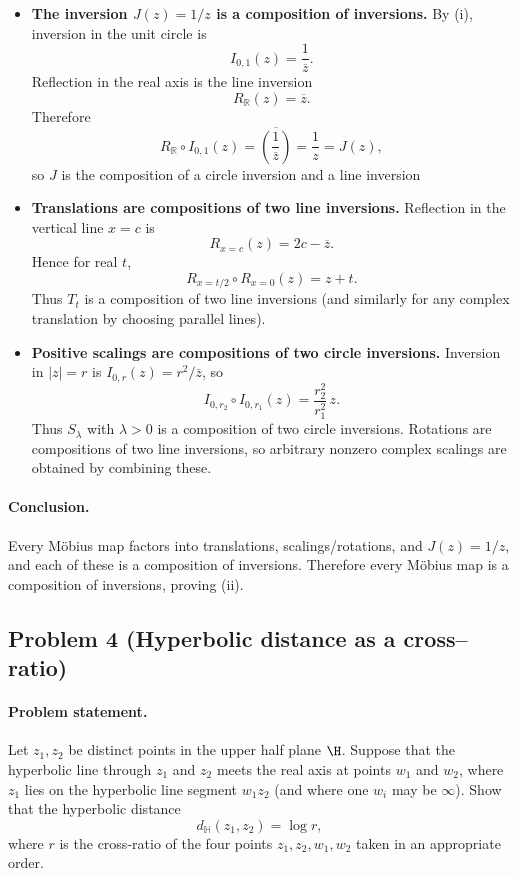 \documentclass[12pt,a4paper]{article}
\newcommand{\hyp}{\mathbb{H}}
\theoremstyle{plain}
\theoremstyle{definition}      %
\begin{document}
	\begin{itemize}
		\item \textbf{The inversion $J(z)=1/z$ is a composition of inversions.}
		By (i), inversion in the unit circle is
		\[
		I_{0,1}(z)=\frac{1}{\overline{z}}.
		\]
Reflection in the real axis is the line inversion
\[
R_{\mathbb{R}}(z)=\overline{z}.
\]
Therefore
\[
R_{\mathbb{R}}\circ I_{0,1}(z)=\overline{\left(\frac{1}{\overline{z}}\right)}=\frac{1}{z}=J(z),
\]
so $J$ is the composition of a circle inversion and a line inversion
		
		\item \textbf{Translations are compositions of two line inversions.}
		Reflection in the vertical line $x=c$ is
		\[
		R_{x=c}(z)=2c-\overline{z}.
		\]
		Hence for real $t$,
		\[
		R_{x=t/2}\circ R_{x=0}(z)=z+t.
		\]
		Thus $T_t$ is a composition of two line inversions (and similarly for any complex translation by choosing parallel lines).
		
		\item \textbf{Positive scalings are compositions of two circle inversions.}
		Inversion in $|z|=r$ is $I_{0,r}(z)=r^{2}/\overline{z}$, so
		\[
		I_{0,r_2}\circ I_{0,r_1}(z)=\frac{r_2^2}{r_1^2}\,z.
		\]
		Thus $S_\lambda$ with $\lambda>0$ is a composition of two circle inversions. Rotations are compositions of two line inversions,
		so arbitrary nonzero complex scalings are obtained by combining these.
	\end{itemize}
	
	\paragraph{\textbf{Conclusion.}}
	Every Möbius map factors into translations, scalings/rotations, and $J(z)=1/z$, and each of these is a composition of inversions.
	Therefore every Möbius map is a composition of inversions, proving (ii).
	
	\subsection*{Problem 4 (Hyperbolic distance as a cross--ratio)}
	
	\paragraph{Problem statement.}
	Let $z_1,z_2$ be distinct points in the upper half plane $\H$.
	Suppose that the hyperbolic line through $z_1$ and $z_2$ meets the real axis
	at points $w_1$ and $w_2$, where $z_1$ lies on the hyperbolic line segment
	$w_1 z_2$ (and where one $w_i$ may be $\infty$).
	Show that the hyperbolic distance
	\[
	d_{\hyp}(z_1,z_2)=\log r,
	\]
	where $r$ is the cross-ratio of the four points $z_1,z_2,w_1,w_2$ taken in an
	appropriate order.
	
\end{document}
